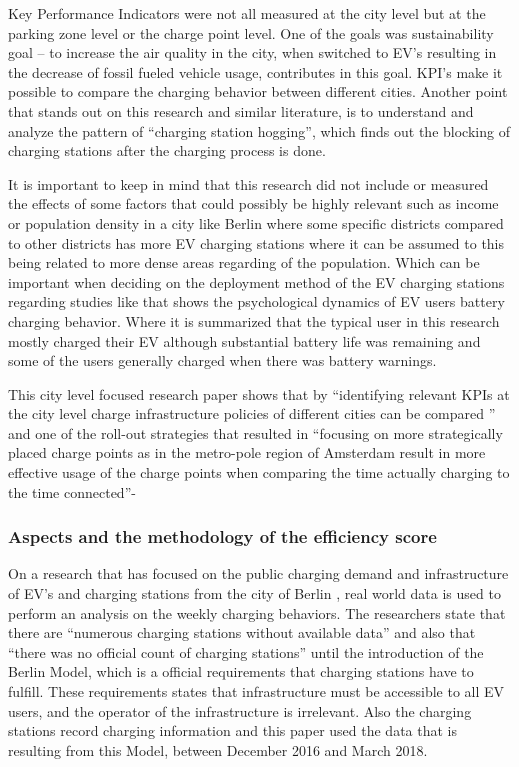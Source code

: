 	Key Performance Indicators were not all measured at the city level but at the parking zone level or the charge point level. One of the goals was sustainability goal – to increase the air quality in the city, when switched to EV’s resulting in the decrease of fossil fueled vehicle usage, contributes in this goal. \gls{KPI}’s make it possible to compare the charging behavior between different cities. Another point that stands out on this research and similar literature, is to understand and analyze the pattern of “charging station hogging”, which finds out the blocking of charging stations after the charging process is done. \cite{Wolbertus2016,Flammini2019,Mortimer2021}

It is important to keep in mind that this research did not include or measured the effects of some factors that could possibly be highly relevant such as income or population density in a city like Berlin where some specific districts compared to other districts has more EV charging stations where it can be assumed to this being related to more dense areas regarding of the population. Which can be important when deciding on the deployment method of the EV charging stations regarding studies like \cite{FrankeKrems} that shows the psychological dynamics of EV users battery charging behavior. Where it is summarized that the typical user in this research mostly charged their EV although substantial battery life was remaining and some of the users generally charged when there was battery warnings.

This city level focused research paper shows that by “identifying relevant KPIs at the city level charge infrastructure policies of different cities can be compared \cite{Wolbertus2016}” and one of the roll-out strategies that resulted in “focusing on more strategically placed charge points as in the metro-pole region of Amsterdam result in more effective usage of the charge points when comparing the time actually charging to the time connected”-\cite{Wolbertus2016}

\subsubsection{Aspects and the methodology of the efficiency score}


On a research that has focused on the public charging demand and infrastructure of EV’s and charging stations from the city of Berlin \cite{Hardinghaus2020}, real world data is used to perform an analysis on the weekly charging behaviors. The researchers \cite{Hardinghaus2020} state that there are “numerous charging stations without available data” and also that “there was no official count of charging stations” until the introduction of the Berlin Model, which is a official requirements that charging stations have to fulfill. These requirements states that infrastructure must be accessible to all EV users, and the operator of the infrastructure is irrelevant. Also the charging stations record charging information and this paper used the data that is resulting from this Model, between December 2016 and March 2018.

